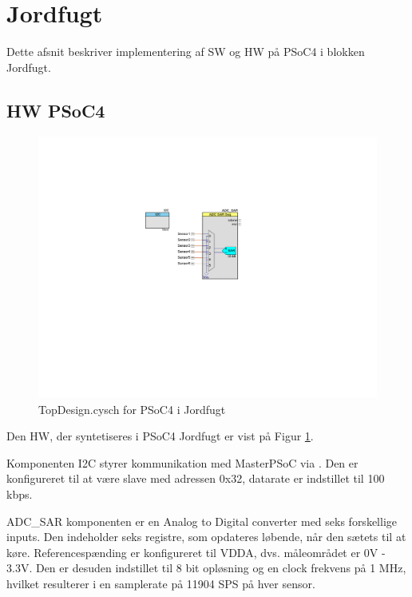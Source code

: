 \section{Jordfugt} \label{sec:JrdImpl}

Dette afsnit beskriver implementering af SW og HW på PSoC4 i blokken Jordfugt. 

\subsection{HW PSoC4}
\begin{figure}[h]
\centering 
\includegraphics[width={\textwidth-6cm}, trim = 250 270 310 160, clip=true] {../fig/TopDesign_Jordfugt.pdf}
\caption{TopDesign.cysch for PSoC4 i Jordfugt}
\label{fig:topdesign_jordfugt}
\end{figure}

Den HW, der syntetiseres i PSoC4 Jordfugt er vist på Figur \ref{fig:topdesign_jordfugt}. 

Komponenten I2C styrer kommunikation med MasterPSoC via \IIC. 
Den er konfigureret til at være slave med adressen 0x32, datarate er indstillet til 100 kbps.

ADC\_SAR komponenten er en Analog to Digital converter med seks forskellige inputs. Den indeholder seks registre, som opdateres løbende, når den sætets til at køre. Referencespænding er konfigureret til VDDA, dvs. måleområdet er 0V - 3.3V.
Den er desuden indstillet til 8 bit opløsning og en clock frekvens på 1 MHz, hvilket resulterer i en samplerate på 11904 SPS på hver sensor.

